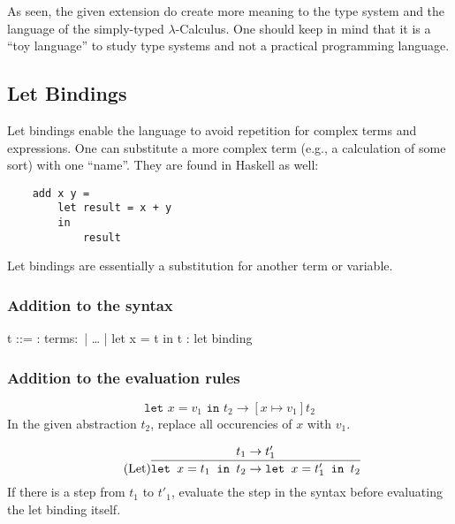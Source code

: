 As seen, the given extension do create more meaning to the type system
and the language of the simply-typed $\lambda$-Calculus. One should
keep in mind that it is a ``toy language'' to study type systems and not
a practical programming language.

\subsection{Let Bindings}
\label{subsec:let}

Let bindings enable the language to avoid repetition for complex
terms and expressions. One can substitute a more complex term
(e.g., a calculation of some sort) with one ``name''.
They are found in Haskell as well:

\begin{verbatim}
    add x y =
        let result = x + y
        in
            result
\end{verbatim}

Let bindings are essentially a substitution for another term or
variable.

\subsubsection{Addition to the syntax \cite{pierce2002ProgLang}}
\begin{bnfgrammar}
    t ::= : terms$\colon$
    | \dots
    | let x = t in t : let binding
\end{bnfgrammar}\leavevmode\newline

\subsubsection{Addition to the evaluation rules \cite{pierce2002ProgLang}}
\begin{equation*}
    \tag{Let-Bind Value}
    \texttt{let } x = v_1 \texttt{ in } t_2 \rightarrow [x \mapsto v_1] t_2
\end{equation*}
In the given abstraction $t_2$, replace all occurencies of $x$ with $v_1$.

\begin{equation*}
    \tag{Let}
    \infer{
        \texttt{let } x=t_1 \texttt{ in } t_2 \rightarrow \texttt{let } x=t'_1 \texttt{ in } t_2
    }{
        t_1 \rightarrow t'_1
    }
\end{equation*}
If there is a step from $t_1$ to $t'_1$, evaluate the step
in the syntax before evaluating the let binding itself.

